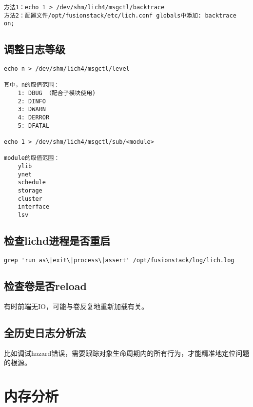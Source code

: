 \begin{lstlisting}
方法1：echo 1 > /dev/shm/lich4/msgctl/backtrace
方法2：配置文件/opt/fusionstack/etc/lich.conf globals中添加: backtrace on;
\end{lstlisting}

\subsection{调整日志等级}

\begin{lstlisting}
echo n > /dev/shm/lich4/msgctl/level

其中，n的取值范围：
    1: DBUG （配合子模块使用)
    2: DINFO
    3: DWARN
    4: DERROR
    5: DFATAL

echo 1 > /dev/shm/lich4/msgctl/sub/<module>

module的取值范围：
    ylib
    ynet
    schedule
    storage
    cluster
    interface
    lsv
\end{lstlisting}


\subsection{检查lichd进程是否重启}


\begin{lstlisting}
grep 'run as\|exit\|process\|assert' /opt/fusionstack/log/lich.log
\end{lstlisting}

\subsection{检查卷是否reload}

有时前端无IO，可能与卷反复地重新加载有关。

\subsection{全历史日志分析法}

比如调试hazard错误，需要跟踪对象生命周期内的所有行为，才能精准地定位问题的根源。

\section{内存分析}

